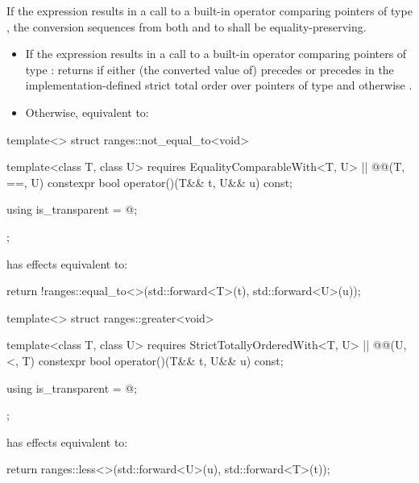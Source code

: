 \begin{itemdescr}
\pnum
\expects
If the expression 
results in a call to a built-in operator \tcode{==} comparing pointers of type
, the conversion sequences from both  and  to 
shall be equality-preserving.

\pnum
\effects
\begin{itemize}
\item
  If the expression  results in
  a call to a built-in operator \tcode{==} comparing pointers of type :
  returns  if either (the converted value of)  precedes
   or  precedes  in the implementation-defined strict
  total order over pointers of type  and otherwise .

\item
  Otherwise, equivalent to:
\end{itemize}
\end{itemdescr}

%
\begin{itemdecl}
template<> struct ranges::not_equal_to<void> {
  template<class T, class U>
    requires EqualityComparableWith<T, U> || @@(T, ==, U)
  constexpr bool operator()(T&& t, U&& u) const;

  using is_transparent = @\unspecnc@;
};
\end{itemdecl}

\begin{itemdescr}
\pnum
{} has effects equivalent to:
\begin{codeblock}
return !ranges::equal_to<>{}(std::forward<T>(t), std::forward<U>(u));
\end{codeblock}
\end{itemdescr}

%
\begin{itemdecl}
template<> struct ranges::greater<void> {
  template<class T, class U>
    requires StrictTotallyOrderedWith<T, U> || @@(U, <, T)
  constexpr bool operator()(T&& t, U&& u) const;

  using is_transparent = @\unspecnc@;
};
\end{itemdecl}

\begin{itemdescr}
\pnum
{} has effects equivalent to:
\begin{codeblock}
return ranges::less<>{}(std::forward<U>(u), std::forward<T>(t));
\end{codeblock}
\end{itemdescr}

